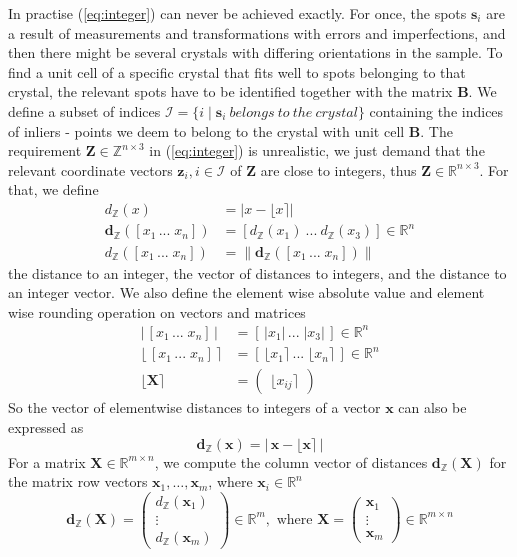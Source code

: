 \documentclass[a4paper,10pt]{article}
\newcommand{\vect}[1]{\mathbf{#1}}
\newcommand{\mat}[1]{\mathbf{#1}}
\newcommand{\round}[1]{\lfloor #1 \rceil}
\newcommand{\distZ}[1]{d_\mathbb{Z}(#1)}
\newcommand{\distvecZ}[1]{\vect{d}_\mathbb{Z}(#1)}
\begin{document}
In practise (\ref{eq:integer}) can never be achieved exactly. For once, the spots $\vect{s}_i$ are a result of measurements and transformations with errors and imperfections, and then there might be several crystals with differing orientations in the sample. To find a unit cell of a specific crystal that fits well to spots belonging to that crystal, the relevant spots have to be identified together with the matrix $\mat{B}$. We define a subset of indices $\mathcal{I} = \{i \mid \vect{s}_i\ belongs\ to\ the\ crystal \}$ containing the indices of inliers - points we deem to belong to the crystal with unit cell $\mat{B}$. The requirement $\mat{Z} \in \mathbb{Z}^{n \times 3}$ in (\ref{eq:integer}) is unrealistic, we just demand that the relevant coordinate vectors $\vect{z}_i, i \in \mathcal{I}$ of $\mat{Z}$ are close to integers, thus $\mat{Z} \in \mathbb{R}^{n \times 3}$. For that, we define
%
\[
 \begin{split}
  \distZ{x} &= |x - \round{x}| \\
  \distvecZ{[x_1\, ...\; x_n]} &= [\distZ{x_1}\ ...\ \distZ{x_3}] \in \mathbb{R}^n\\
  \distZ{[x_1\, ...\; x_n]} &= \|\distvecZ{[x_1\, ...\; x_n]}\|
 \end{split}
\]
%
the distance to an integer, the vector of distances to integers, and the distance to an integer vector. We also define the element wise absolute value and element wise rounding operation on vectors and matrices
%
\[
 \begin{split}
  |\,[x_1\, ...\; x_n]\,| &= [\,|x_1|\, ...\; |x_3|\,] \in \mathbb{R}^n \\
  \round{\,[x_1\, ...\; x_n]\,} &= [\,\round{x_1}\, ...\; \round{x_n}\,] \in \mathbb{R}^n \\
  \round{\mat{X}} &= \begin{pmatrix} \round{x_{ij}} \end{pmatrix}
 \end{split}
\]
%
So the vector of elementwise distances to integers of a vector $\vect{x}$ can also be expressed as
%
\[
  \distvecZ{\vect{x}} = |\, \vect{x} - \round{\vect{x}}\,|
\]
%
For a matrix $\mat{X}\in \mathbb{R}^{m\times n}$, we compute the column vector of distances $\vect{d}_{\mathbb{Z}}(\mat{X})$ for the matrix row vectors $\vect{x}_1,\hdots ,\vect{x}_m$, where $\vect{x}_i\in \mathbb{R}^n$
%
\[
 \distvecZ{\mat{X}} = \begin{pmatrix} \distZ{\vect{x}_1} \\ \vdots \\ \distZ{\vect{x}_m} \end{pmatrix}\in \mathbb{R}^m,
 \text{ where }\mat{X} = \begin{pmatrix} \vect{x}_1 \\ \vdots \\ \vect{x}_m \end{pmatrix}\in \mathbb{R}^{m\times n}
\]
\end{document}
